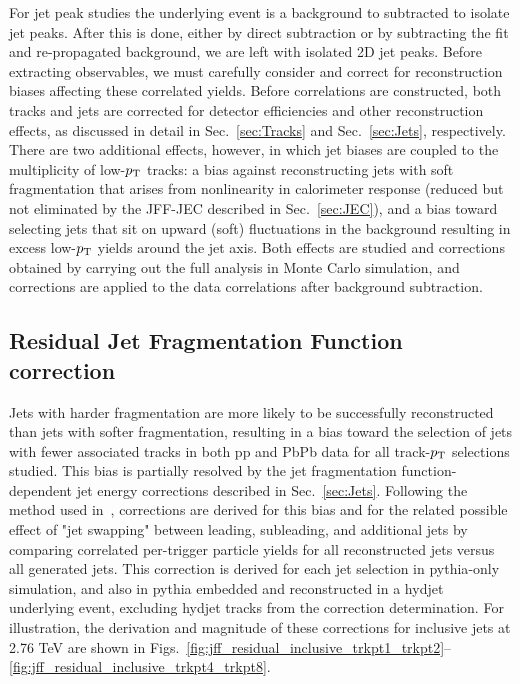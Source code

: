 For jet peak studies the underlying event is a background to subtracted to isolate jet peaks.  After this is done, either by direct subtraction or by subtracting the fit and re-propagated background, we are left with isolated 2D jet peaks.  Before extracting observables, we must carefully consider and correct for reconstruction biases affecting these correlated yields.  Before correlations are constructed, both tracks and jets are corrected for detector efficiencies and other reconstruction effects, as discussed in detail in Sec.~\ref{sec:Tracks} and Sec.~\ref{sec:Jets}, respectively.  There are two additional effects, however, in which jet biases are coupled to the multiplicity of low-$p_{\rm T}$ tracks:  a bias against reconstructing jets with soft fragmentation that arises from nonlinearity in calorimeter response (reduced but not eliminated by the JFF-JEC described in Sec.~\ref{sec:JEC}), and a bias toward selecting jets that sit on upward (soft) fluctuations in the background resulting in excess low-$p_{\rm T}$ yields around the jet axis.  Both effects are studied and corrections obtained by carrying out the full analysis in Monte Carlo simulation, and corrections are applied to the data correlations after background subtraction.  

\subsection{Residual Jet Fragmentation Function correction}
	
	
Jets with harder fragmentation are more likely to be successfully reconstructed than jets with softer fragmentation, resulting in a bias toward the selection of jets with fewer associated tracks in both pp and PbPb data for all track-$p_{\rm T}$ selections studied.  This bias is partially resolved by the jet fragmentation function-dependent jet energy corrections described in Sec.~\ref{sec:Jets}.  Following the method used in~\cite{HIN_2014_010}, corrections are derived for this bias and for the related possible effect of "jet swapping" between leading, subleading, and additional jets by comparing correlated per-trigger particle yields for all reconstructed jets versus all generated jets.  This correction is derived for each jet selection in {\sc pythia}-only simulation, and also in {\sc pythia} embedded and reconstructed in a {\sc hydjet} underlying event, excluding {\sc hydjet} tracks from the correction determination.  For illustration, the derivation and magnitude of these corrections for inclusive jets at 2.76 TeV are shown in Figs.~\ref{fig:jff_residual_inclusive_trkpt1_trkpt2}--\ref{fig:jff_residual_inclusive_trkpt4_trkpt8}.

